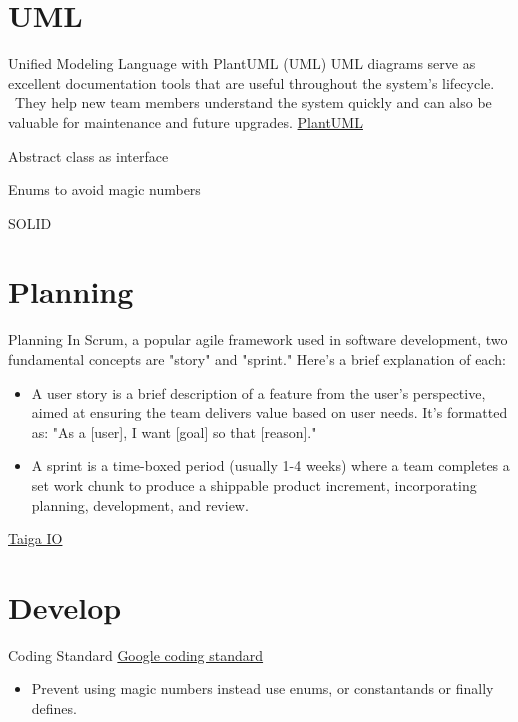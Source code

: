 \documentclass[10pt]{beamer}
\begin{document}
\section{UML}
\begin{frame} {Unified Modeling Language with PlantUML (UML)}
  UML diagrams serve as excellent documentation tools that are useful throughout the system's lifecycle. \
  They help new team members understand the system quickly and can also be valuable for maintenance and future upgrades.
  \href{https://plantuml.com/}{PlantUML}
\end{frame}

\begin{frame} {Abstract class as interface}
\end{frame}

\begin{frame} {Enums to avoid magic numbers}
\end{frame}

\begin{frame} {SOLID}
\end{frame}

\section{Planning}
\begin{frame} {Planning}
  In Scrum, a popular agile framework used in software development, two fundamental concepts are "story" and "sprint." Here's a brief explanation of each:
  \begin{itemize}
    \item A user story is a brief description of a feature from the user's perspective, aimed at ensuring the team delivers value based on user needs. It’s formatted as: "As a [user], I want [goal] so that [reason]."
    \item A sprint is a time-boxed period (usually 1-4 weeks) where a team completes a set work chunk to produce a shippable product increment, incorporating planning, development, and review.
  \end{itemize}

  \href{Taiga.io}{Taiga IO}
\end{frame}

\section{Develop}

\begin{frame} {Coding Standard}
  \href{https://google.github.io/styleguide/cppguide.html}{Google coding standard}
  \begin{itemize}
    \item Prevent using magic numbers instead use enums, or constantands or finally defines.
  \end{itemize}
\end{frame}
\end{document}
